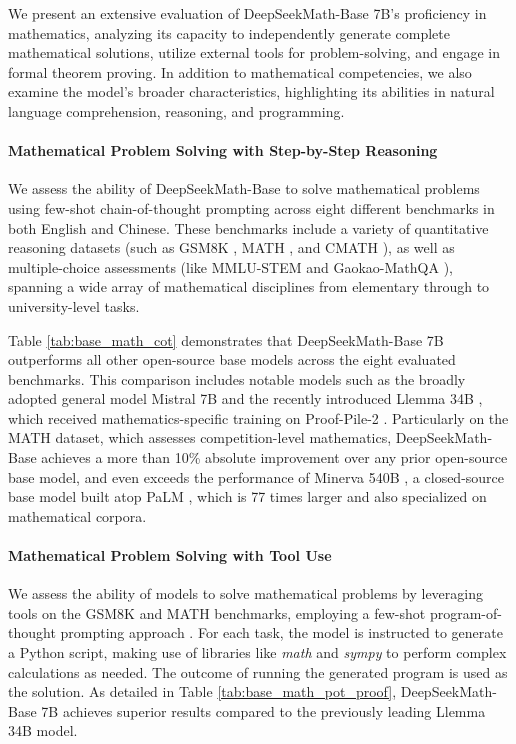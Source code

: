 \begin{itemize}[topsep=0pt]
We present an extensive evaluation of DeepSeekMath-Base 7B's proficiency in mathematics, analyzing its capacity to independently generate complete mathematical solutions, utilize external tools for problem-solving, and engage in formal theorem proving. In addition to mathematical competencies, we also examine the model’s broader characteristics, highlighting its abilities in natural language comprehension, reasoning, and programming.

\paragraph{Mathematical Problem Solving with Step-by-Step Reasoning}

We assess the ability of DeepSeekMath-Base to solve mathematical problems using few-shot chain-of-thought prompting \citep{cot} across eight different benchmarks in both English and Chinese. These benchmarks include a variety of quantitative reasoning datasets (such as GSM8K \citep{gsm8k}, MATH \citep{MATH}, and CMATH \citep{wei2023cmath}), as well as multiple-choice assessments (like MMLU-STEM \citep{mmlu} and Gaokao-MathQA \citep{agieval}), spanning a wide array of mathematical disciplines from elementary through to university-level tasks.

Table \ref{tab:base_math_cot} demonstrates that DeepSeekMath-Base 7B outperforms all other open-source base models across the eight evaluated benchmarks. This comparison includes notable models such as the broadly adopted general model Mistral 7B \citep{mistral} and the recently introduced Llemma 34B \citep{llemma}, which received mathematics-specific training on Proof-Pile-2 \citep{llemma}. Particularly on the MATH dataset, which assesses competition-level mathematics, DeepSeekMath-Base achieves a more than 10\% absolute improvement over any prior open-source base model, and even exceeds the performance of Minerva 540B \citep{minerva}, a closed-source base model built atop PaLM \citep{palm}, which is 77 times larger and also specialized on mathematical corpora.

\paragraph{Mathematical Problem Solving with Tool Use} We assess the ability of models to solve mathematical problems by leveraging tools on the GSM8K and MATH benchmarks, employing a few-shot program-of-thought prompting approach \citep{pot,pal}. For each task, the model is instructed to generate a Python script, making use of libraries like \textit{math} and \textit{sympy} to perform complex calculations as needed. The outcome of running the generated program is used as the solution. As detailed in Table \ref{tab:base_math_pot_proof}, DeepSeekMath-Base 7B achieves superior results compared to the previously leading Llemma 34B model.


\end{itemize}
